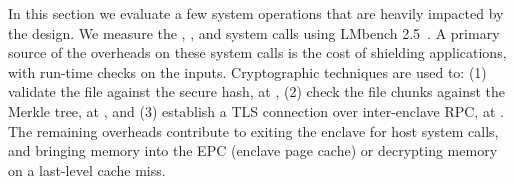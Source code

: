 In this section we evaluate a few system operations that are heavily impacted by the \graphenesgx{} design.
We measure the , , and  system calls
using LMbench 2.5~\cite{McVoy:lmbench}.
A primary source of the overheads on these system calls is the cost of shielding applications, with run-time checks on the inputs.
Cryptographic techniques are used to: (1) validate the file against the secure hash, at , (2) check the file chunks against the Merkle tree, at , and (3) establish a TLS connection over inter-enclave RPC, at .
The remaining overheads contribute to exiting the enclave for host system calls, and bringing memory into the EPC (enclave page cache) or decrypting 
memory on a last-level cache miss. %

